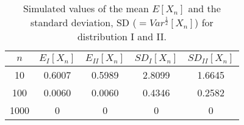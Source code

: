 \begin{table}[!htbp]
\centering
\begin{tabular}{ccccc}
  \hline
  \noalign{\smallskip}
  $n$ & $E_I[X_n]$ &$E_{II}[X_n]$ & $SD_I[X_n]$ & $SD_{II}[X_n]$   \\
  \hline
  \noalign{\smallskip}
  10   & 0.6007 & 0.5989 & 2.8099 & 1.6645     \\
  100  & 0.0060 & 0.0060 & 0.4346 & 0.2582     \\
  1000 & 0 & 0 & 0 & 0    \\
  \hline
\end{tabular}
\caption{Simulated values of the mean $E[X_n]$ and the standard deviation, SD ($=Var^{\frac{1}{2}}[X_n]$) for distribution I and II.}
\label{simtable}
\end{table}





















